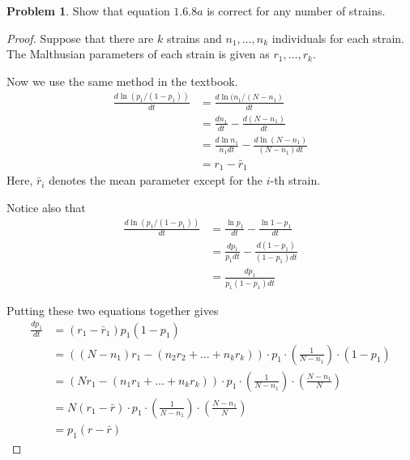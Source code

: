 \documentclass[12pt]{report}
\theoremstyle{definition}
\newtheorem{problem}{Problem}[chapter]
\begin{document}
        \begin{problem}
            Show that equation $1.6.8a$ is correct for any number of strains.
            \begin{proof}
                Suppose that there are $k$ strains and $n_1, \ldots, n_k$ individuals for each strain. The Malthusian parameters of each strain is given as $r_1, \ldots, r_k$.

                Now we use the same method in the textbook.
                \begin{equation*}
                    \begin{split}
                        \frac{d \ln(p_1/(1-p_1))}{dt}
                        &= \frac{d \ln(n_1/(N-n_1)}{dt}  \\
                        &= \frac{d n_1}{dt} - \frac{d (N-n_1)}{dt} \\
                        &= \frac{d \ln{n_1}}{n_1 dt} - \frac{d \ln(N-n_1)}{(N-n_1) dt} \\
                        &= r_1 - \bar{r}_1
                    \end{split}
                \end{equation*}
                Here, $\bar{r}_i$ denotes the mean parameter except for the $i$-th strain. 

                Notice also that
                \begin{equation*}
                    \begin{split}
                        \frac{d \ln(p_1/(1-p_1))}{dt}
                        &= \frac{\ln{p_1}}{dt} - \frac{\ln{1-p_1}}{dt} \\
                        &= \frac{d p_1}{p_1 dt} - \frac{d (1-p_1)}{(1-p_1)dt} \\
                        & = \frac{dp_1}{p_1(1-p_1)dt}
                    \end{split}
                \end{equation*}

                Putting these two equations together gives
                \begin{equation*}
                    \begin{split}
                        \frac{dp_1}{dt} 
                        &= (r_1-\bar{r}_1)p_1(1-p_1) \\
                        &= ((N-n_1)r_1 - (n_2r_2 + \ldots + n_kr_k)) \cdot p_1 \cdot
                        \left(\frac{1}{N-n_1}\right) \cdot (1-p_1) \\
                        &= (Nr_1 - (n_1r_1 + \ldots + n_kr_k)) \cdot p_1 \cdot
                        \left(\frac{1}{N-n_1}\right) \cdot 
                        \left(\frac{N-n_1}{N}\right) \\
                        &= N(r_1 - \bar{r}) \cdot p_1 \cdot
                        \left(\frac{1}{N-n_1}\right) \cdot 
                        \left(\frac{N-n_1}{N}\right) \\
                        &= p_1(r-\bar{r})
                    \end{split}
                \end{equation*}
            \end{proof}



\end{problem}
\end{document}
